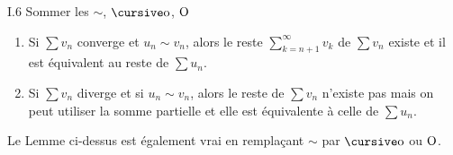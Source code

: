 \begin{center}
	\large\sc I.6 \quad Sommer les $\sim$, $\po$, $\operatorname*{O}$
\end{center}

\bigskip

\begin{lem}
	\begin{enumerate}
		\item Si $\sum v_n$\/ converge et $u_n \sim v_n$, alors le reste $\sum_{k = n+1}^\infty v_k$\/ de $\sum v_n$\/ existe et il est équivalent au reste de $\sum u_n$.
		\item Si $\sum v_n$\/ diverge et si $u_n \sim v_n$, alors le reste de $\sum v_n$\/ n'existe pas mais on peut utiliser la somme partielle et elle est équivalente à celle de $\sum u_n$.
	\end{enumerate}
	\medskip
	\noindent Le {\sc Lemme}\/ ci-dessus est également vrai en remplaçant $\sim$\/ par $\po$\/ ou $\operatorname*{O}$.
\end{lem}

\begin{thm}
\end{thm}

